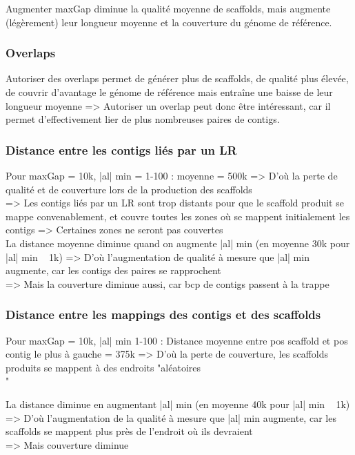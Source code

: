 \documentclass[12pt]{article}
\begin{document}
Augmenter maxGap diminue la qualité moyenne de scaffolds, mais augmente (légèrement) leur longueur moyenne et la couverture du génome de référence. \\

\subsubsection{Overlaps}

Autoriser des overlaps permet de générer plus de scaffolds, de qualité plus élevée, de couvrir d'avantage le génome de référence mais entraîne une baisse de leur longueur moyenne => Autoriser un overlap peut donc être intéressant, car il permet d'effectivement lier de plus nombreuses paires de contigs. \\

\subsubsection{Distance entre les contigs liés par un LR}

Pour maxGap = 10k, |al| min = 1-100 : moyenne = 500k => D'où la perte de qualité et de couverture lors de la production des scaffolds \\
=> Les contigs liés par un LR sont trop distants pour que le scaffold produit se mappe convenablement, et couvre toutes les zones où se mappent initialement les contigs => Certaines zones ne seront pas couvertes \\

La distance moyenne diminue quand on augmente |al| min (en moyenne 30k pour |al| min ~ 1k) => D'où l'augmentation de qualité à mesure que |al| min augmente, car les contigs des paires se rapprochent \\
=> Mais la couverture diminue aussi, car bcp de contigs passent à la trappe

\subsubsection{Distance entre les mappings des contigs et des scaffolds}

Pour maxGap = 10k, |al| min 1-100 : Distance moyenne entre pos scaffold et pos contig le plus à gauche = 375k => D'où la perte de couverture,
les scaffolds produits se mappent à des endroits "aléatoires \\"

La distance diminue en augmentant |al| min (en moyenne 40k pour |al| min ~ 1k) => D'où l'augmentation de la qualité à mesure que |al| min augmente, car
les scaffolds se mappent plus près de l'endroit où ils devraient \\
=> Mais couverture diminue
\end{document}

